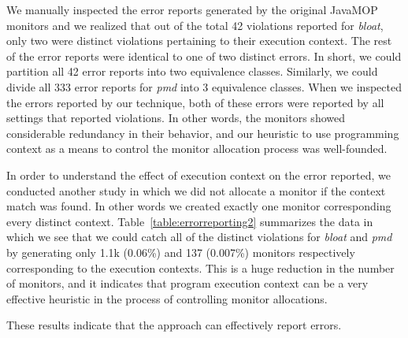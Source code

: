 We manually inspected the error reports generated by the original JavaMOP 
monitors and we realized that out of the total 42 violations reported for 
\textit{bloat}, only two were distinct violations pertaining to their execution 
context. The rest of the error reports were identical to one of two distinct 
errors. In short, we could partition all 42 error reports into two equivalence 
classes. Similarly, we could divide all 333 error reports for \textit{pmd} into 
3 equivalence classes. When we inspected the errors reported by our technique, 
both of these errors were reported by all settings that reported violations. In 
other words, the monitors showed considerable redundancy in their behavior, and 
our heuristic to use programming context as a means to control the monitor 
allocation process was well-founded.

In order to understand the effect of execution context on the error reported, we 
conducted another study in which we did not allocate a monitor if the context 
match was found. In other words we created exactly one monitor corresponding 
every distinct context. Table~\ref{table:errorreporting2} summarizes the data in 
which we see that we could catch all of the distinct violations for 
\textit{bloat} and \textit{pmd} by generating only 1.1k (0.06\%) and 137 
(0.007\%) monitors respectively corresponding to the execution contexts. This is 
a huge reduction in the number of monitors, and it indicates that program 
execution context can be a very effective heuristic in the process of 
controlling monitor allocations.

These results indicate that the approach can effectively report errors.


